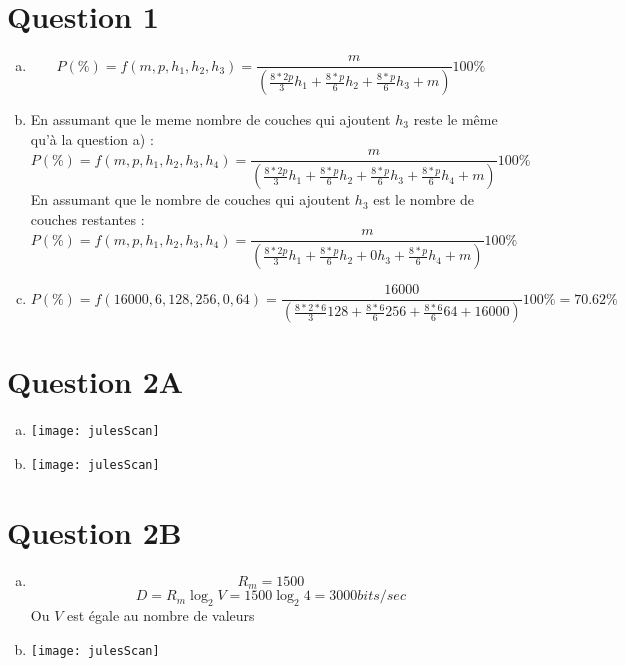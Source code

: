 
\section{Question 1}
\begin{enumerate}[(a)]
	\item 
		\[ P(\%) = f(m, p, h_1, h_2, h_3) = 
		\frac{m}{(\frac{8*2p}{3}h_1 + \frac{8*p}{6}h_2 + \frac{8*p}{6}h_3 + m)} 100\%\]
	
	\item 
		En assumant que le meme nombre de couches qui ajoutent $h_3$ reste le même qu'à la
		question a) :
		\[ P(\%) = f(m, p, h_1, h_2, h_3, h_4) = 
		\frac{m}{(\frac{8*2p}{3}h_1 + \frac{8*p}{6}h_2 + \frac{8*p}{6}h_3 + \frac{8*p}{6}h_4 + m)} 100\%\]
	En assumant que le nombre de couches qui ajoutent $h_3$ est le nombre de couches restantes :  
		\[ P(\%) = f(m, p, h_1, h_2, h_3, h_4) = 
		\frac{m}{(\frac{8*2p}{3}h_1 + \frac{8*p}{6}h_2 + 0h_3 + \frac{8*p}{6}h_4 + m)} 100\%\]
	\item
		\[ P(\%) = f(16000, 6, 128, 256, 0, 64) = 
		\frac{16000}{(\frac{8*2*6}{3}128 + \frac{8*6}{6}256 + \frac{8*6}{6}64 + 16000)} 100\% = 70.62\%\]
\end{enumerate}

\section{Question 2A}

\begin{enumerate}[(a)]
	\item
		\parbox{\linewidth}{\centering
		\texttt{[image: julesScan]}
		}
	\item
		\parbox{\linewidth}{\centering
		\texttt{[image: julesScan]}
		}

\end{enumerate}

\pagebreak

\section{Question 2B}

\begin{enumerate}[(a)]
	\item 
		\[R_m = 1500\]
		\[D = R_m\log_2 V = 1500\log_2 4 = 3000bits/sec\]
		Ou $V$ est égale au nombre de valeurs
	\item
		\parbox{\linewidth}{\centering
		\texttt{[image: julesScan]}
		}
		
\end{enumerate}


